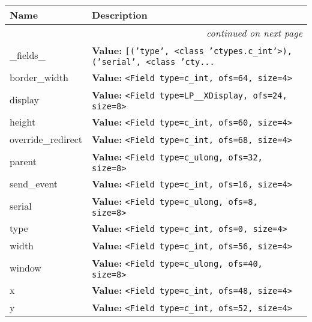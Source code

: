     \vspace{-1cm}
\hspace{\varindent}\begin{longtable}{|p{\varnamewidth}|p{\vardescrwidth}|l}
\cline{1-2}
\cline{1-2} \centering \textbf{Name} & \centering \textbf{Description}& \\
\cline{1-2}
\endhead\cline{1-2}\multicolumn{3}{r}{\small\textit{continued on next page}}\\\endfoot\cline{1-2}
\endlastfoot\raggedright \_\-f\-i\-e\-l\-d\-s\-\_\- & \raggedright \textbf{Value:} 
{\tt \texttt{[}\texttt{(}\texttt{'}\texttt{type}\texttt{'}\texttt{, }{\textless}class 'ctypes.c\_int'{\textgreater}\texttt{)}\texttt{, }\texttt{(}\texttt{'}\texttt{serial}\texttt{'}\texttt{, }{\textless}class 'cty\texttt{...}}&\\
\cline{1-2}
\raggedright b\-o\-r\-d\-e\-r\-\_\-w\-i\-d\-t\-h\- & \raggedright \textbf{Value:} 
{\tt {\textless}Field type=c\_int, ofs=64, size=4{\textgreater}}&\\
\cline{1-2}
\raggedright d\-i\-s\-p\-l\-a\-y\- & \raggedright \textbf{Value:} 
{\tt {\textless}Field type=LP\_\_XDisplay, ofs=24, size=8{\textgreater}}&\\
\cline{1-2}
\raggedright h\-e\-i\-g\-h\-t\- & \raggedright \textbf{Value:} 
{\tt {\textless}Field type=c\_int, ofs=60, size=4{\textgreater}}&\\
\cline{1-2}
\raggedright o\-v\-e\-r\-r\-i\-d\-e\-\_\-r\-e\-d\-i\-r\-e\-c\-t\- & \raggedright \textbf{Value:} 
{\tt {\textless}Field type=c\_int, ofs=68, size=4{\textgreater}}&\\
\cline{1-2}
\raggedright p\-a\-r\-e\-n\-t\- & \raggedright \textbf{Value:} 
{\tt {\textless}Field type=c\_ulong, ofs=32, size=8{\textgreater}}&\\
\cline{1-2}
\raggedright s\-e\-n\-d\-\_\-e\-v\-e\-n\-t\- & \raggedright \textbf{Value:} 
{\tt {\textless}Field type=c\_int, ofs=16, size=4{\textgreater}}&\\
\cline{1-2}
\raggedright s\-e\-r\-i\-a\-l\- & \raggedright \textbf{Value:} 
{\tt {\textless}Field type=c\_ulong, ofs=8, size=8{\textgreater}}&\\
\cline{1-2}
\raggedright t\-y\-p\-e\- & \raggedright \textbf{Value:} 
{\tt {\textless}Field type=c\_int, ofs=0, size=4{\textgreater}}&\\
\cline{1-2}
\raggedright w\-i\-d\-t\-h\- & \raggedright \textbf{Value:} 
{\tt {\textless}Field type=c\_int, ofs=56, size=4{\textgreater}}&\\
\cline{1-2}
\raggedright w\-i\-n\-d\-o\-w\- & \raggedright \textbf{Value:} 
{\tt {\textless}Field type=c\_ulong, ofs=40, size=8{\textgreater}}&\\
\cline{1-2}
\raggedright x\- & \raggedright \textbf{Value:} 
{\tt {\textless}Field type=c\_int, ofs=48, size=4{\textgreater}}&\\
\cline{1-2}
\raggedright y\- & \raggedright \textbf{Value:} 
{\tt {\textless}Field type=c\_int, ofs=52, size=4{\textgreater}}&\\
\cline{1-2}
\end{longtable}


